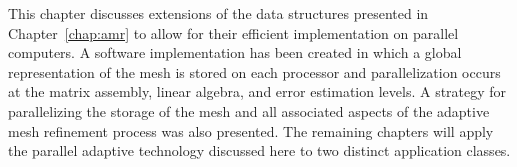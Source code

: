 This chapter discusses extensions of the data structures presented in Chapter~\ref{chap:amr} to allow for their efficient implementation on parallel computers.  A software implementation has been created in which a global representation of the mesh is stored on each processor and parallelization occurs at the matrix assembly, linear algebra, and error estimation levels.  A strategy for parallelizing the storage of the mesh and all associated aspects of the adaptive mesh refinement process was also presented.  The remaining chapters will apply the parallel adaptive technology discussed here to two distinct application classes.  


